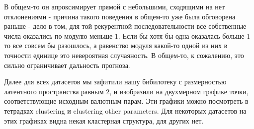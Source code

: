 \documentclass[11pt]{article}
\begin{document}
В общем-то он апроксимирует прямой с небольшими, сходящими на нет отклонениями - причина такого поведения в общем-то уже была обговорена раньше - дело в том, для той рекурентной последовательности все собственные числа оказались по модулю меньше 1. Если бы хотя бы одна оказалась больше 1 то все совсем бы разошлось, а равенство модуля какой-то одной из них в точности единице это невероятная случаяность. В общем-то, к сожалению, это сильно ограничивает дальность прогноза.

Далее для всех датасетов мы зафитили нашу бибилотеку с размерностью латентного пространства равным 2, и изобразили на двухмерном графике точки, соответствующие исходным валютным парам. Эти графики можно посмотреть в тетрадках clustering и clustering other parameters. Для некоторых датасетов на этих графиках видна некая кластерная структура, для других нет.
\end{document}
